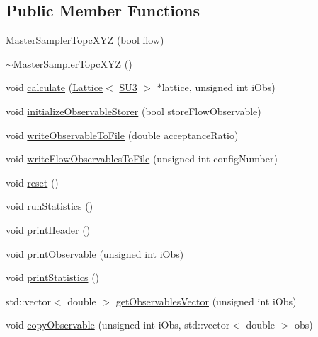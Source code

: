 \subsection*{Public Member Functions}
\begin{DoxyCompactItemize}
\item 
\mbox{\hyperlink{class_master_sampler_topc_x_y_z_ad8ba8f2c50c66d823c551f71fd62a99b}{Master\+Sampler\+Topc\+X\+YZ}} (bool flow)
\item 
\mbox{\hyperlink{class_master_sampler_topc_x_y_z_a7e896952c909a1f29f97e0ef4c52d348}{$\sim$\+Master\+Sampler\+Topc\+X\+YZ}} ()
\item 
void \mbox{\hyperlink{class_master_sampler_topc_x_y_z_a0ea80ad9935db791f00461b7dfd548b7}{calculate}} (\mbox{\hyperlink{class_lattice}{Lattice}}$<$ \mbox{\hyperlink{class_s_u3}{S\+U3}} $>$ $\ast$lattice, unsigned int i\+Obs)
\item 
void \mbox{\hyperlink{class_master_sampler_topc_x_y_z_af6d2cf2023d9626908fd26b07a7a0b84}{initialize\+Observable\+Storer}} (bool store\+Flow\+Observable)
\item 
void \mbox{\hyperlink{class_master_sampler_topc_x_y_z_a930f13a2a13f4b3820f40c8b52110cf2}{write\+Observable\+To\+File}} (double acceptance\+Ratio)
\item 
void \mbox{\hyperlink{class_master_sampler_topc_x_y_z_a4fba4290e4406e18ef3f2904c6ae364f}{write\+Flow\+Observables\+To\+File}} (unsigned int config\+Number)
\item 
void \mbox{\hyperlink{class_master_sampler_topc_x_y_z_aef8d0b1b431711c6410cfece1c007b4a}{reset}} ()
\item 
void \mbox{\hyperlink{class_master_sampler_topc_x_y_z_af748653ded9908f78383185475b9ddeb}{run\+Statistics}} ()
\item 
void \mbox{\hyperlink{class_master_sampler_topc_x_y_z_a630a504ecbf3ceb517ebeefb39c3faff}{print\+Header}} ()
\item 
void \mbox{\hyperlink{class_master_sampler_topc_x_y_z_ab2312c9e9dc1e9deeb5bce36784372ac}{print\+Observable}} (unsigned int i\+Obs)
\item 
void \mbox{\hyperlink{class_master_sampler_topc_x_y_z_a5a34a7f90ce8eea6c0efa06cfdfeb5f1}{print\+Statistics}} ()
\item 
std\+::vector$<$ double $>$ \mbox{\hyperlink{class_master_sampler_topc_x_y_z_a1a922db23320ff46f8f736788c6977bb}{get\+Observables\+Vector}} (unsigned int i\+Obs)
\item 
void \mbox{\hyperlink{class_master_sampler_topc_x_y_z_a49ef8ccce4bf9473017bbb7c01f1404b}{copy\+Observable}} (unsigned int i\+Obs, std\+::vector$<$ double $>$ obs)
\end{DoxyCompactItemize}
